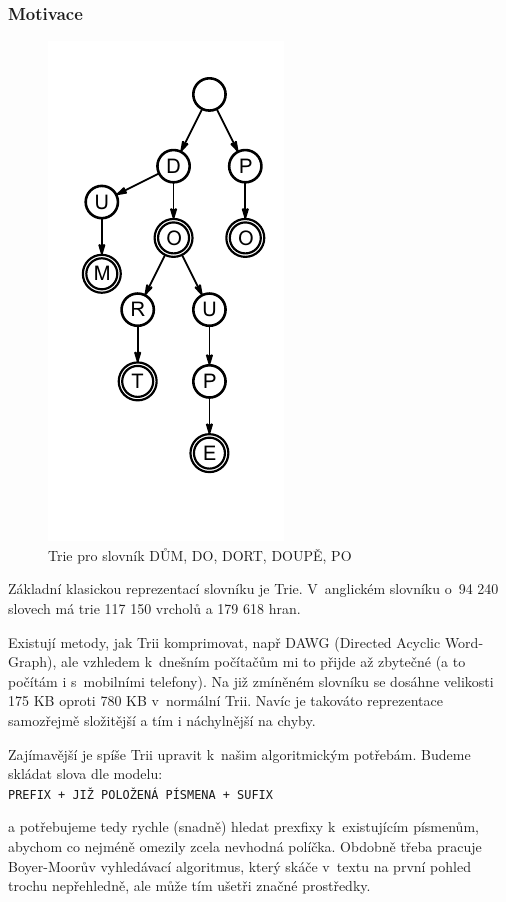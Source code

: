\documentclass[a4paper]{article}
\begin{document}
\subsubsection{Motivace}\begin{figure}[htb]
\centering
\includegraphics{pic/trie-all.pdf}
\caption{Trie pro slovník DŮM, DO, DORT, DOUPĚ, PO}
\label{trie}
\end{figure}
Základní klasickou reprezentací slovníku je Trie. V~anglickém slovníku o~94 240 slovech má trie 117 150 vrcholů a 179 618 hran. 

Existují metody, jak Trii komprimovat, např DAWG (Directed Acyclic Word-Graph), ale vzhledem k~dnešním počítačům mi to přijde až zbytečné (a to počítám i s~mobilními telefony). Na již zmíněném slovníku se dosáhne velikosti 175 KB oproti 780 KB v~normální Trii. Navíc je takováto reprezentace samozřejmě složitější a tím i náchylnější na chyby. 

Zajímavější je spíše Trii upravit k~našim algoritmickým potřebám. Budeme skládat slova dle modelu:\\
\texttt{PREFIX + JIŽ POLOŽENÁ PÍSMENA + SUFIX}

a potřebujeme tedy rychle (snadně) hledat prexfixy k~existujícím písmenům, abychom co nejméně omezily zcela nevhodná políčka. Obdobně třeba pracuje Boyer-Moorův vyhledávací algoritmus, který skáče v~textu na první pohled trochu nepřehledně, ale může tím ušetři značné prostředky.
\end{document}
